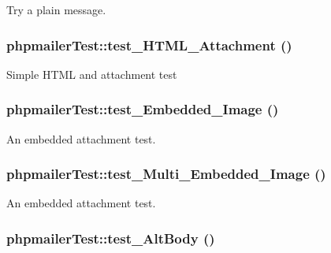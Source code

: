 Try a plain message. \hypertarget{classphpmailerTest_3e39c323b9a15751108f6eeff848199c}{
\subsubsection[test\_\-HTML\_\-Attachment]{\setlength{\rightskip}{0pt plus 5cm}phpmailerTest::test\_\-HTML\_\-Attachment ()}}
\label{classphpmailerTest_3e39c323b9a15751108f6eeff848199c}


Simple HTML and attachment test \hypertarget{classphpmailerTest_f9e53f9c6563e8435fcb1089ca3ef950}{
\subsubsection[test\_\-Embedded\_\-Image]{\setlength{\rightskip}{0pt plus 5cm}phpmailerTest::test\_\-Embedded\_\-Image ()}}
\label{classphpmailerTest_f9e53f9c6563e8435fcb1089ca3ef950}


An embedded attachment test. \hypertarget{classphpmailerTest_63912e1771f7eb477a8d539393d954d3}{
\subsubsection[test\_\-Multi\_\-Embedded\_\-Image]{\setlength{\rightskip}{0pt plus 5cm}phpmailerTest::test\_\-Multi\_\-Embedded\_\-Image ()}}
\label{classphpmailerTest_63912e1771f7eb477a8d539393d954d3}


An embedded attachment test. \hypertarget{classphpmailerTest_3176773f378632c17dc95f4d6df2d42c}{
\subsubsection[test\_\-AltBody]{\setlength{\rightskip}{0pt plus 5cm}phpmailerTest::test\_\-AltBody ()}}
\label{classphpmailerTest_3176773f378632c17dc95f4d6df2d42c}


